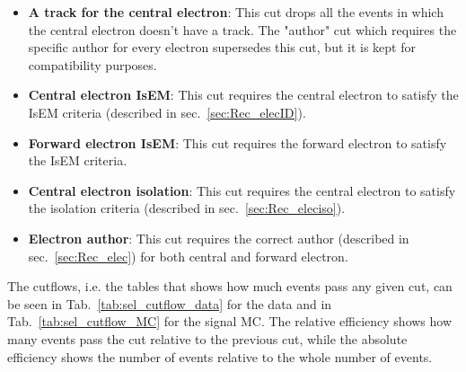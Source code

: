 \begin{itemize}
\item {\bfseries A track for the central electron}: This cut drops all the events in which the central electron doesn't have a track. The "author" cut which requires the specific author for every electron supersedes this cut, but it is kept for compatibility purposes.
\item {\bfseries Central electron IsEM}: This cut requires the central electron to satisfy the IsEM criteria (described in sec.~\ref{sec:Rec_elecID}).
\item {\bfseries Forward electron IsEM}: This cut requires the forward electron to satisfy the IsEM criteria.
\item {\bfseries Central electron isolation}: This cut requires the central electron to satisfy the isolation criteria (described in sec.~\ref{sec:Rec_eleciso}).
\item {\bfseries Electron author}: This cut requires the correct author (described in sec.~\ref{sec:Rec_elec}) for both central and forward electron.
\end{itemize}

The cutflows, i.e. the tables that shows how much events pass any given cut, can be seen in Tab.~\ref{tab:sel_cutflow_data} for the data and in Tab.~\ref{tab:sel_cutflow_MC} for the signal MC. The relative efficiency shows how many events pass the cut relative to the previous cut, while the absolute efficiency shows the number of events relative to the whole number of events.

